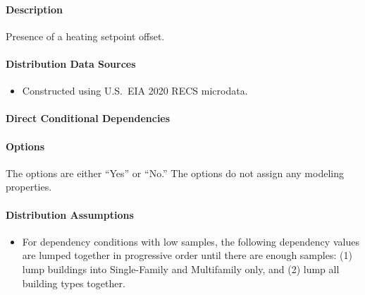 \paragraph{Description}
% 
Presence of a heating setpoint offset.

\paragraph{Distribution Data Sources}
% 
\begin{itemize}
    \item Constructed using U.S.~EIA 2020 RECS microdata.
\end{itemize}

\paragraph{Direct Conditional Dependencies}


\paragraph{Options}
The options are either ``Yes'' or ``No.'' The options do not assign any modeling properties.

\paragraph{Distribution Assumptions}
% 
\begin{itemize}
    \item For dependency conditions with low samples, the following dependency values are lumped together in progressive order until there are enough samples: (1) lump buildings into Single-Family and Multifamily only, and (2) lump all building types together.
\end{itemize}
